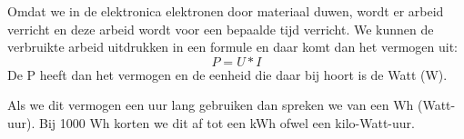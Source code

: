 Omdat we in de elektronica elektronen door materiaal duwen, wordt er arbeid verricht en deze arbeid wordt voor een bepaalde tijd verricht. We kunnen de verbruikte arbeid uitdrukken in een formule en daar komt dan het vermogen uit: \[ P = U*I \]
De P heeft dan het vermogen en de eenheid die daar bij hoort is de Watt (W).

Als we dit vermogen een uur lang gebruiken dan spreken we van een Wh (Watt-uur). Bij 1000 Wh korten we dit af tot een kWh ofwel een kilo-Watt-uur.

